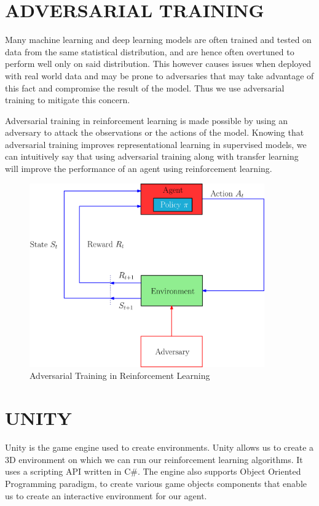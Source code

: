 \section{ADVERSARIAL TRAINING}

Many machine learning and deep learning models are often
trained and tested on data from the same statistical
distribution, and are hence often overtuned to perform well
only on said distribution. This however causes issues when
deployed with real world data and may be prone to adversaries
that may take advantage of this fact and compromise the
result of the model. Thus we use adversarial training to
mitigate this concern.

Adversarial training in reinforcement learning is made
possible by using an adversary to attack the observations or
the actions of the model. Knowing that adversarial training
improves representational learning in supervised models, we
can intuitively say that using adversarial training along
with transfer learning will improve the performance of an
agent using reinforcement learning.

\begin{figure}[H]
    \centering
    \includegraphics[width=0.9\textwidth]{images/rl_atv3.png}
    \caption{Adversarial Training in Reinforcement Learning}
    \label{fig:rl}
\end{figure}

\section{UNITY}

Unity is the game engine used to create
environments. Unity allows us to create a 3D environment on
which we can run our reinforcement learning algorithms. It
uses a scripting API written in C\#. The engine also supports
Object Oriented Programming paradigm, to create various game
objects components that enable us to create an interactive
environment for our agent.

